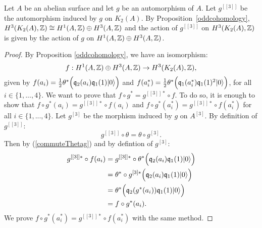 \begin{cor}\label{actionH3}
Let $A$ be an abelian surface and let $g$ be an automorphism of $A$. Let $g^{[[3]]}$ be the automorphism induced by $g$ on $K_2(A)$.
By Proposition~\ref{oddcohomology}, $H^3(K_2(A),\mathbb{Z})\cong H^1(A,\mathbb{Z})\oplus H^3(A,\mathbb{Z})$ and the action of $g^{[[3]]}$ on $H^3(K_2(A),\mathbb{Z})$ is given by the action of $g$ on $H^1(A,\mathbb{Z})\oplus H^3(A,\mathbb{Z})$.
\end{cor}
\begin{proof}
By Proposition \ref{oddcohomology}, we have an isomorphism:
$$f:H^1(A,\mathbb{Z})\oplus H^3(A,\mathbb{Z})\rightarrow H^3(K_2(A),\mathbb{Z}),$$
given by $f(a_i)=\frac{1}{2}\theta^*\Big(\mathfrak{q}_2(a_i)\mathfrak{q}_1(1)|0\rangle\Big)$ and $f(a_i^*)=\frac{1}{2}\theta^*\Big( \mathfrak{q}_1(a^*_i)\mathfrak{q}_1(1)^2|0\rangle \Big)$, for all $i\in\{1,...,4\}$.
We want to prove that $f\circ g^*=g^{[[3]]*}\circ f$. 
To do so, it is enough to show that $f\circ g^*(a_i)=g^{[[3]]*}\circ f(a_i)$ and $f\circ g^*(a_i^*)=g^{[[3]]*}\circ f(a_i^*)$ for all $i\in\{1,...,4\}$.
Let $g^{[3]}$ be the morphism induced by $g$ on $A^{[3]}$. By definition of $g^{[[3]]}$:
\begin{equation}
g^{[[3]]}\circ \theta=\theta\circ g^{[3]}.
\label{commuteThetag}
\end{equation}
Then by (\ref{commuteThetag}) and by defintion of $g^{[3]}$:
\begin{align*}
 g^{[[3]]*}\circ f(a_i)&=g^{[[3]]*}\circ\theta^*\Big(\mathfrak{q}_2(a_i)\mathfrak{q}_1(1)|0\rangle\Big)\\
 &=\theta^*\circ g^{[3]*}\Big(\mathfrak{q}_2(a_i)\mathfrak{q}_1(1)|0\rangle\Big)\\
 &=\theta^*\Big(\mathfrak{q}_2(g^*(a_i))\mathfrak{q}_1(1)|0\rangle\Big)\\
 &=f\circ g^*(a_i).
\end{align*}
We prove $f\circ g^*(a_i^*)=g^{[[3]]*}\circ f(a_i^*)$ with the same method.


\end{proof}
